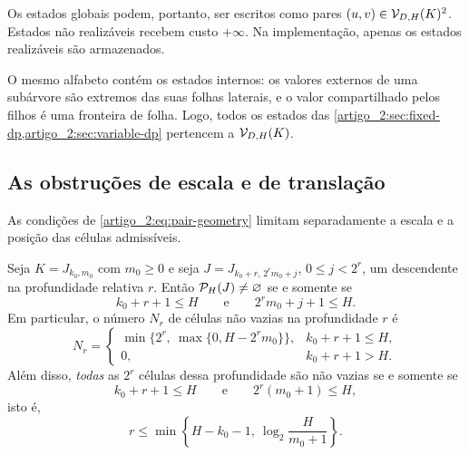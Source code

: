 Os estados globais podem, portanto, ser escritos como pares
$(u,v)\in\mathcal{V}_{D,H}(K)^2$. Estados não realizáveis recebem custo
$+\infty$. Na implementação, apenas os estados realizáveis são armazenados.

O mesmo alfabeto contém os estados internos: os valores externos de uma subárvore são extremos das suas folhas laterais, e o valor compartilhado pelos filhos é uma fronteira de folha. Logo, todos os estados das \cref{artigo_2:sec:fixed-dp,artigo_2:sec:variable-dp} pertencem a $\mathcal{V}_{D,H}(K)$.

\subsection{As obstruções de escala e de translação}

As condições de \eqref{artigo_2:eq:pair-geometry} limitam separadamente a escala e a posição das células admissíveis.

\begin{proposition}\label{map:artigo_2:4.5}
\label{artigo_2:prop:translation-obstruction}
Seja $K=J_{k_0,m_0}$ com $m_0\ge0$ e seja
$J=J_{k_0+r,\,2^rm_0+j}$, $0\le j<2^r$, um descendente na profundidade
relativa $r$. Então $\mathcal{P}_H(J)\ne\varnothing$ se e somente se
\begin{equation}
 k_0+r+1\le H
 \qquad\text{e}\qquad
 2^rm_0+j+1\le H.
 \label{artigo_2:eq:two-obstructions}
\end{equation}
Em particular, o número $N_r$ de células não vazias na profundidade $r$ é
\begin{equation}
 N_r=
 \begin{cases}
 \min\{2^r,\ \max\{0,H-2^rm_0\}\},&k_0+r+1\le H,\\
 0,&k_0+r+1>H.
 \end{cases}
 \label{artigo_2:eq:nonempty-cell-count}
\end{equation}
Além disso, \emph{todas} as $2^r$ células dessa profundidade são não vazias
se e somente se
\begin{equation}
 k_0+r+1\le H
 \qquad\text{e}\qquad
 2^r(m_0+1)\le H,
 \label{artigo_2:eq:uniform-refinement-conditions}
\end{equation}
isto é,
\begin{equation}
 r\le
 \min\!\left\{H-k_0-1,\ \log_2\frac{H}{m_0+1}\right\}.
 \label{artigo_2:eq:uniform-refinement-depth}
\end{equation}
\end{proposition}

